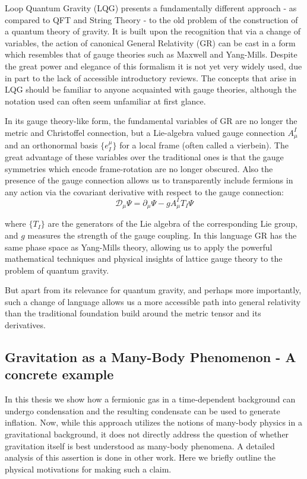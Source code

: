 \begin{doublespace}
Loop Quantum Gravity (LQG) presents a fundamentally different approach
- as compared to QFT and String Theory - to the old problem of the
construction of a quantum theory of gravity. It is built upon the
recognition that via a change of variables, the action of canonical
General Relativity (GR) can be cast in a form which resembles that
of gauge theories such as Maxwell and Yang-Mills. Despite the great power and elegance of this formalism it is not yet
very widely used, due in part to the lack of accessible introductory
reviews. The concepts that arise in LQG should be familiar to anyone
acquainted with gauge theories, although the notation used can often
seem unfamiliar at first glance.

In its gauge theory-like form, the fundamental variables of GR are
no longer the metric and Christoffel connection, but a Lie-algebra
valued gauge connection $A_{\mu}^{I}$ and an orthonormal basis $\{e_{I}^{\mu}\}$
for a local frame (often called a vierbein). The great advantage of
these variables over the traditional ones is that the gauge symmetries
which encode frame-rotation are no longer obscured. Also the presence
of the gauge connection allows us to transparently include fermions
in any action via the covariant derivative with respect to the gauge
connection:\[
\mathcal{D}_{\mu}\Psi=\partial_{\mu}\Psi-gA_{\mu}^{I}T_{I}\Psi\]


where $\{T_{I}\}$ are the generators of the Lie algebra of the corresponding
Lie group, and $g$ measures the strength of the gauge coupling. In
this language GR has the same phase space as Yang-Mills theory, allowing
us to apply the powerful mathematical techniques and physical insights
of lattice gauge theory to the problem of quantum gravity.

But apart from its relevance for quantum gravity, and perhaps more importantly, such a change of language allows us a more accessible path into general relativity than the traditional foundation build around the metric tensor and its derivatives.

\subsection{Gravitation as a Many-Body Phenomenon - A concrete example}

In this thesis we show how a fermionic gas in a time-dependent background can undergo condensation and the resulting condensate can be used to generate inflation. Now, while this approach utilizes the notions of many-body physics in a gravitational background, it does not directly address the question of whether gravitation itself is best understood as many-body phenomena. A detailed analysis of this assertion is done in other work. Here we briefly outline the physical motivations for making such a claim.


\end{doublespace}
